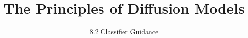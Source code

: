
\title{The Principles of Diffusion Models}
\subtitle{8.2 Classifier Guidance}


\begin{frame}
    \titlepage
\end{frame}


